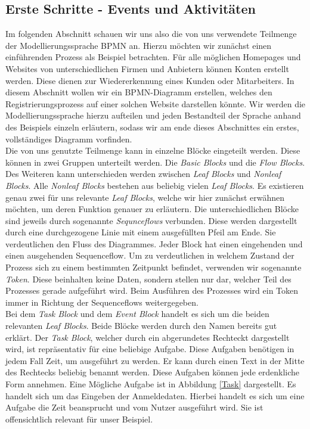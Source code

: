 \subsection{Erste Schritte - Events und Aktivitäten}\label{Erste Schritte - Events und Aktivitäten}
Im folgenden Abschnitt schauen wir uns also die von uns verwendete Teilmenge der Modellierungssprache BPMN an. Hierzu möchten wir zunächst einen einführenden Prozess als Beispiel betrachten. Für alle möglichen Homepages und Websites von unterschiedlichen Firmen und Anbietern können Konten erstellt werden. Diese dienen zur Wiedererkennung eines Kunden oder Mitarbeiters. In diesem Abschnitt wollen wir ein BPMN-Diagramm erstellen, welches den Registrierungsprozess auf einer solchen Website darstellen könnte. Wir werden die Modellierungssprache hierzu aufteilen und jeden Bestandteil der Sprache anhand des Beispiels einzeln erläutern, sodass wir am ende dieses Abschnittes ein erstes, vollständiges Diagramm vorfinden.\\
Die von uns genutzte Teilmenge kann in einzelne Blöcke eingeteilt werden. Diese können in zwei Gruppen unterteilt werden. Die \textit{Basic Blocks} und die \textit{Flow Blocks}. Des Weiteren kann unterschieden werden zwischen \textit{Leaf Blocks} und \textit{Nonleaf Blocks}. Alle \textit{Nonleaf Blocks} bestehen aus beliebig vielen \textit{Leaf Blocks}. Es existieren genau zwei für uns relevante \textit{Leaf Blocks}, welche wir hier zunächst erwähnen möchten, um deren Funktion genauer zu erläutern. Die unterschiedlichen Blöcke sind jeweils durch sogenannte \textit{Sequnceflows} verbunden. Diese werden dargestellt durch eine durchgezogene Linie mit einem ausgefüllten Pfeil am Ende. Sie verdeutlichen den Fluss des Diagrammes. Jeder Block hat einen eingehenden und einen ausgehenden Sequenceflow. Um zu verdeutlichen in welchem Zustand der Prozess sich zu einem bestimmten Zeitpunkt befindet, verwenden wir sogenannte \textit{Token}. Diese beinhalten keine Daten, sondern stellen nur dar, welcher Teil des Prozesses gerade aufgeführt wird. Beim Ausführen des Prozesses wird ein Token immer in Richtung der Sequenceflows weitergegeben.\\
Bei dem \textit{Task Block} und dem \textit{Event Block} handelt es sich um die beiden relevanten \textit{Leaf Blocks}. Beide Blöcke werden durch den Namen bereits gut erklärt. Der \textit{Task Block}, welcher durch ein abgerundetes Rechteckt dargestellt wird, ist repräsentativ für eine beliebige Aufgabe. Diese Aufgaben benötigen in jedem Fall Zeit, um ausgeführt zu werden. Er kann durch einen Text in der Mitte des Rechtecks beliebig benannt werden. Diese Aufgaben können jede erdenkliche Form annehmen. Eine Mögliche Aufgabe ist in Abbildung \ref{Task} dargestellt. Es handelt sich um das Eingeben der Anmeldedaten. Hierbei handelt es sich um eine Aufgabe die Zeit beansprucht und vom Nutzer ausgeführt wird. Sie ist offensichtlich relevant für unser Beispiel.\\
